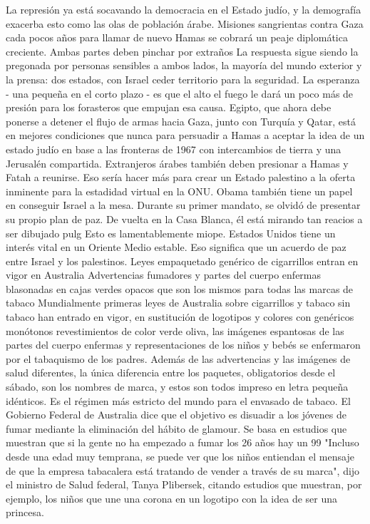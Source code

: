 La represión ya está socavando la democracia en el Estado judío, y la demografía exacerba esto como las olas de población árabe.
Misiones sangrientas contra Gaza cada pocos años para llamar de nuevo Hamas se cobrará un peaje diplomática creciente.
Ambas partes deben pinchar por extraños
La respuesta sigue siendo la pregonada por personas sensibles a ambos lados, la mayoría del mundo exterior y la prensa: dos estados, con Israel ceder territorio para la seguridad.
La esperanza - una pequeña en el corto plazo - es que el alto el fuego le dará un poco más de presión para los forasteros que empujan esa causa.
Egipto, que ahora debe ponerse a detener el flujo de armas hacia Gaza, junto con Turquía y Qatar, está en mejores condiciones que nunca para persuadir a Hamas a aceptar la idea de un estado judío en base a las fronteras de 1967 con intercambios de tierra y una Jerusalén compartida.
Extranjeros árabes también deben presionar a Hamas y Fatah a reunirse.
Eso sería hacer más para crear un Estado palestino a la oferta inminente para la estadidad virtual en la ONU.
Obama también tiene un papel en conseguir Israel a la mesa.
Durante su primer mandato, se olvidó de presentar su propio plan de paz.
De vuelta en la Casa Blanca, él está mirando tan reacios a ser dibujado pulg
Esto es lamentablemente miope.
Estados Unidos tiene un interés vital en un Oriente Medio estable.
Eso significa que un acuerdo de paz entre Israel y los palestinos.
Leyes empaquetado genérico de cigarrillos entran en vigor en Australia
Advertencias fumadores y partes del cuerpo enfermas blasonadas en cajas verdes opacos que son los mismos para todas las marcas de tabaco
Mundialmente primeras leyes de Australia sobre cigarrillos y tabaco sin tabaco han entrado en vigor, en sustitución de logotipos y colores con genéricos monótonos revestimientos de color verde oliva, las imágenes espantosas de las partes del cuerpo enfermas y representaciones de los niños y bebés se enfermaron por el tabaquismo de los padres.
Además de las advertencias y las imágenes de salud diferentes, la única diferencia entre los paquetes, obligatorios desde el sábado, son los nombres de marca, y estos son todos impreso en letra pequeña idénticos.
Es el régimen más estricto del mundo para el envasado de tabaco.
El Gobierno Federal de Australia dice que el objetivo es disuadir a los jóvenes de fumar mediante la eliminación del hábito de glamour.
Se basa en estudios que muestran que si la gente no ha empezado a fumar los 26 años hay un 99%
"Incluso desde una edad muy temprana, se puede ver que los niños entiendan el mensaje de que la empresa tabacalera está tratando de vender a través de su marca", dijo el ministro de Salud federal, Tanya Plibersek, citando estudios que muestran, por ejemplo, los niños que une una corona en un logotipo con la idea de ser una princesa.
